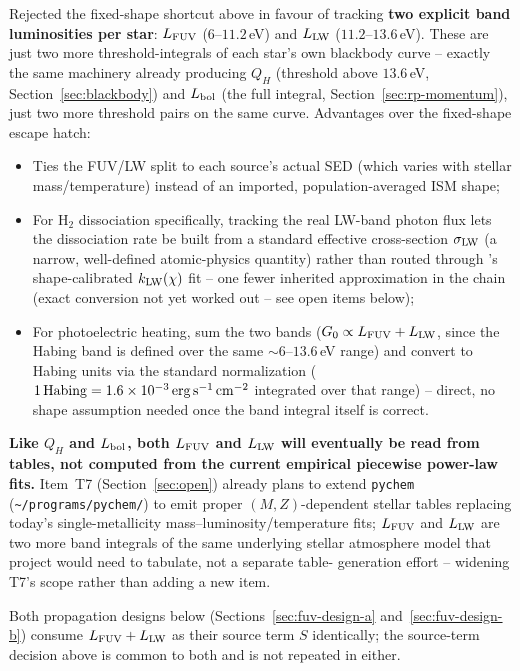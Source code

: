 Rejected the fixed-shape shortcut above in favour of tracking
\textbf{two explicit band luminosities per star}: $L_{\rm FUV}$
($6$--$11.2\,$eV) and $L_{\rm LW}$ ($11.2$--$13.6\,$eV). These are just
two more threshold-integrals of each star's own blackbody curve --
exactly the same machinery already producing $Q_H$ (threshold above
$13.6\,$eV, Section~\ref{sec:blackbody}) and $L_{\rm bol}$ (the full
integral, Section~\ref{sec:rp-momentum}), just two more threshold
pairs on the same curve. Advantages over the fixed-shape escape hatch:
\begin{itemize}
  \item Ties the FUV/LW split to each source's actual SED (which
    varies with stellar mass/temperature) instead of an imported,
    population-averaged ISM shape;
  \item For H$_2$ dissociation specifically, tracking the real
    LW-band photon flux lets the dissociation rate be built from a
    standard effective cross-section $\sigma_{\rm LW}$ (a narrow,
    well-defined atomic-physics quantity) rather than routed through
    \citeauthor{DraineBertoldi1996}'s shape-calibrated $k_{\rm
    LW}(\chi)$ fit -- one fewer inherited approximation in the chain
    (exact conversion not yet worked out -- see open items below);
  \item For photoelectric heating, sum the two bands
    ($G_0\propto L_{\rm FUV}+L_{\rm LW}$, since the Habing band is
    defined over the same $\sim6$--$13.6\,$eV range) and convert to
    Habing units via the standard normalization
    ($1\,{\rm Habing}=1.6\times10^{-3}\,{\rm erg\,s^{-1}\,cm^{-2}}$
    integrated over that range) -- direct, no shape assumption needed
    once the band integral itself is correct.
\end{itemize}
\textbf{Like $Q_H$ and $L_{\rm bol}$, both $L_{\rm FUV}$ and $L_{\rm
LW}$ will eventually be read from tables, not computed from the
current empirical piecewise power-law fits.} Item~T7
(Section~\ref{sec:open}) already plans to extend \texttt{pychem}
(\texttt{\textasciitilde/programs/pychem/}) to emit proper
$(M,Z)$-dependent stellar tables replacing today's single-metallicity
mass--luminosity/temperature fits; $L_{\rm FUV}$ and $L_{\rm LW}$ are
two more band integrals of the same underlying stellar atmosphere
model that project would need to tabulate, not a separate table-
generation effort -- widening T7's scope rather than adding a new item.

Both propagation designs below (Sections~\ref{sec:fuv-design-a}
and~\ref{sec:fuv-design-b}) consume $L_{\rm FUV}+L_{\rm LW}$ as their
source term $S$ identically; the source-term decision above is common
to both and is not repeated in either.

